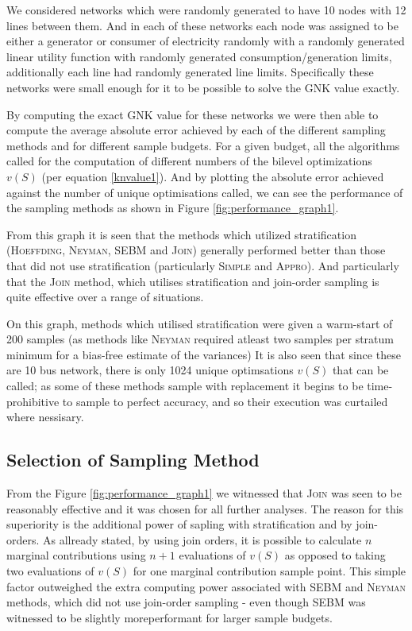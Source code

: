 We considered networks which were randomly generated to have 10 nodes with 12 lines between them.
And in each of these networks each node was assigned to be either a generator or consumer of electricity randomly with a randomly generated linear utility function with randomly generated consumption/generation limits, additionally each line had randomly generated line limits.
Specifically these networks were small enough for it to be possible to solve the GNK value exactly.

By computing the exact GNK value for these networks we were then able to compute the average absolute error achieved by each of the different sampling methods and for different sample budgets.
For a given budget, all the algorithms called for the computation of different numbers of the bilevel optimizations $v(S)$ (per equation \ref{knvalue1}).
And by plotting the absolute error achieved against the number of unique optimisations called, we can see the performance of the sampling methods as shown in Figure \ref{fig:performance_graph1}.

From this graph it is seen that the methods which utilized stratification (\textsc{Hoeffding}, \textsc{Neyman}, \textsc{SEBM} and \textsc{Join})  generally performed better than those that did not use stratification (particularly \textsc{Simple} and \textsc{Appro}).
And particularly that the \textsc{Join} method, which utilises stratification and join-order sampling is quite effective over a range of situations.

On this graph, methods which utilised stratification were given a warm-start of 200 samples (as methods like \textsc{Neyman} required atleast two samples per stratum minimum for a bias-free estimate of the variances)
It is also seen that since these are 10 bus network, there is only 1024 unique optimsations $v(S)$ that can be called; as some of these methods sample with replacement it begins to be time-prohibitive to sample to perfect accuracy, and so their execution was curtailed where nessisary.

\subsection{Selection of Sampling Method}

From the Figure \ref{fig:performance_graph1} we witnessed that \textsc{Join} was seen to be reasonably effective and it was chosen for all further analyses.
The reason for this superiority is the additional power of sapling with stratification and by join-orders.
As allready stated, by using join orders, it is possible to calculate $n$ marginal contributions using $n+1$ evaluations of $v(S)$ as opposed to taking two evaluations of $v(S)$ for one marginal contribution sample point.
This simple factor outweighed the extra computing power associated with \textsc{SEBM} and \textsc{Neyman} methods, which did not use join-order sampling - even though SEBM was witnessed to be slightly moreperformant for larger sample budgets.

